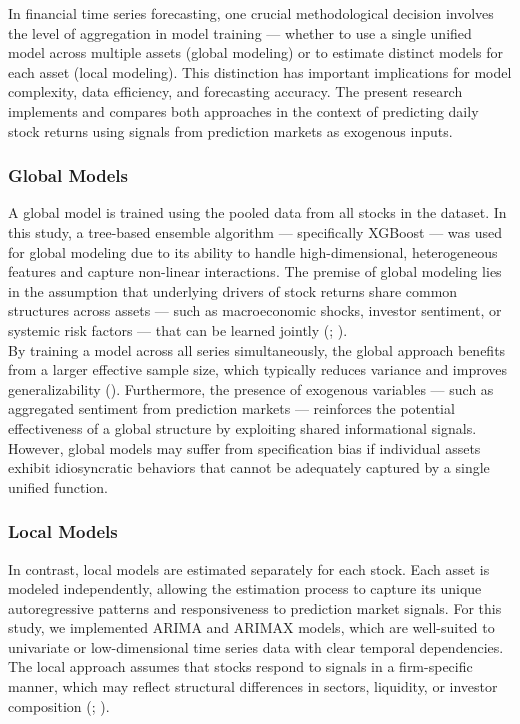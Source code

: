 \documentclass[12pt]{report}
\begin{document}
In financial time series forecasting, one crucial methodological decision involves the level of aggregation in model training — whether to use a single unified model across multiple assets (global modeling) or to estimate distinct models for each asset (local modeling). This distinction has important implications for model complexity, data efficiency, and forecasting accuracy. The present research implements and compares both approaches in the context of predicting daily stock returns using signals from prediction markets as exogenous inputs.

\subsubsection{Global Models}

A global model is trained using the pooled data from all stocks in the dataset. In this study, a tree-based ensemble algorithm — specifically XGBoost — was used for global modeling due to its ability to handle high-dimensional, heterogeneous features and capture non-linear interactions. The premise of global modeling lies in the assumption that underlying drivers of stock returns share common structures across assets — such as macroeconomic shocks, investor sentiment, or systemic risk factors — that can be learned jointly (\cite{hartford_deep_2018}; \cite{gu_empirical_2020}).\\

By training a model across all series simultaneously, the global approach benefits from a larger effective sample size, which typically reduces variance and improves generalizability (\cite{montero_modelling_2021}). Furthermore, the presence of exogenous variables — such as aggregated sentiment from prediction markets — reinforces the potential effectiveness of a global structure by exploiting shared informational signals. However, global models may suffer from specification bias if individual assets exhibit idiosyncratic behaviors that cannot be adequately captured by a single unified function.

\subsubsection{Local Models}

In contrast, local models are estimated separately for each stock. Each asset is modeled independently, allowing the estimation process to capture its unique autoregressive patterns and responsiveness to prediction market signals. For this study, we implemented ARIMA and ARIMAX models, which are well-suited to univariate or low-dimensional time series data with clear temporal dependencies. The local approach assumes that stocks respond to signals in a firm-specific manner, which may reflect structural differences in sectors, liquidity, or investor composition (\cite{de_prado_advances_2018}; \cite{tashman_out-of-sample_2000}).\\
\end{document}
